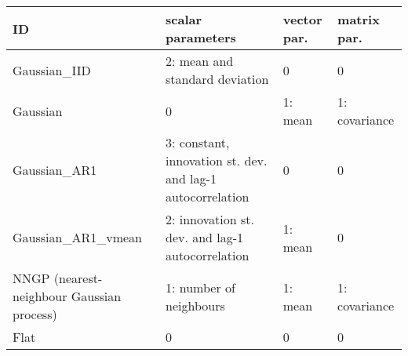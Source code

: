 \documentclass[a4paper]{article}
\begin{document}
	\begin{tabular}{|p{4cm}|p{6cm}|p{3cm}|p{3cm}|}
		\hline
		\textbf{ID} & \textbf{scalar parameters}  & \textbf{vector par.} & \textbf{matrix par.} \\
		\hline
		Gaussian\_IID & 2: mean and standard deviation  & 0 & 0 \\
		\hline
		Gaussian & 0  & 1: mean & 1: covariance \\
		\hline
		Gaussian\_AR1 & 3: constant, innovation st. dev. and lag-1 autocorrelation & 0 & 0 \\
		\hline
		Gaussian\_AR1\_vmean & 2: innovation st. dev. and lag-1 autocorrelation & 1: mean & 0 \\
		\hline
		NNGP (nearest-neighbour Gaussian process) & 1: number of neighbours & 1: mean & 1: covariance \\
		\hline
		Flat & 0 & 0 & 0 \\
		\hline
	\end{tabular}
\end{document}
